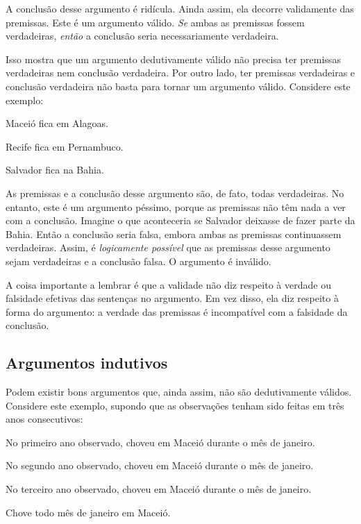 A conclusão desse argumento é ridícula. Ainda assim, ela decorre validamente das premissas. Este é um argumento válido. \emph{Se} ambas as premissas fossem verdadeiras, \emph{então} a conclusão seria necessariamente verdadeira.

Isso mostra que um argumento dedutivamente válido não precisa ter premissas verdadeiras nem conclusão verdadeira. Por outro lado, ter premissas verdadeiras e conclusão verdadeira não basta para tornar um argumento válido. Considere este exemplo:

\begin{earg}
\item[] Maceió fica em Alagoas.
\item[] Recife fica em Pernambuco.
\item[\therefore] Salvador fica na Bahia.
\end{earg}

As premissas e a conclusão desse argumento são, de fato, todas verdadeiras. No entanto, este é um argumento péssimo, porque as premissas não têm nada a ver com a conclusão. Imagine o que aconteceria se Salvador deixasse de fazer parte da Bahia. Então a conclusão seria falsa, embora ambas as premissas continuassem verdadeiras. Assim, é \emph{logicamente possível} que as premissas desse argumento sejam verdadeiras e a conclusão falsa. O argumento é inválido.

A coisa importante a lembrar é que a validade não diz respeito à verdade ou falsidade efetivas das sentenças no argumento. Em vez disso, ela diz respeito à forma do argumento: a verdade das premissas é incompatível com a falsidade da conclusão.

\subsection{Argumentos indutivos}

Podem existir bons argumentos que, ainda assim, não são dedutivamente válidos. Considere este exemplo, supondo que as observações tenham sido feitas em três anos consecutivos:

\begin{earg}
\item[] No primeiro ano observado, choveu em Maceió durante o mês de janeiro.
\item[] No segundo ano observado, choveu em Maceió durante o mês de janeiro.
\item[] No terceiro ano observado, choveu em Maceió durante o mês de janeiro.
\item[\therefore] Chove todo mês de janeiro em Maceió.
\end{earg}

